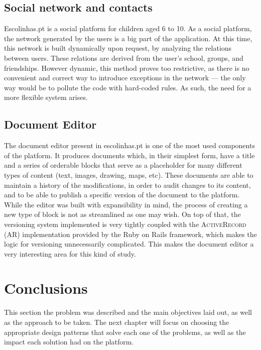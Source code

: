 \subsection{Social network and contacts}\label{sec:case-study_areas_social_network}
Escolinhas.pt is a social platform for children aged 6 to 10. As a social platform, the network generated by the users is a big part of the application. At this time, this network is built dynamically upon request, by analyzing the relations between users. These relations are derived from the user's school, groups, and friendships. However dynamic, this method proves too restrictive, as there is no convenient and correct way to introduce exceptions in the network --- the only way would be to pollute the code with hard-coded rules. As such, the need for a more flexible system arises.

\subsection{Document Editor}\label{sec:case-study_areas_document_editor}
The document editor present in escolinhas.pt is one of the most used components of the platform. It produces documents which, in their simplest form, have a title and a series of orderable blocks that serve as a placeholder for many different types of content (text, images, drawing, maps, etc). These documents are able to maintain a history of the modifications, in order to audit changes to its content, and to be able to publish a specific version of the document to the platform. While the editor was built with expansibility in mind, the process of creating a new type of block is not as streamlined as one may wish. On top of that, the versioning system implemented is very tightly coupled with the \textsc{ActiveRecord} (AR) implementation provided by the Ruby on Rails framework, which makes the logic for versioning unnecessarily complicated. This makes the document editor a very interesting area for this kind of study.

\section{Conclusions}\label{sec:problem_statement_conclusions}

This section the problem was described and the main objectives laid out, as well as the approach to be taken. The next chapter will focus on choosing the appropriate design patterns that solve each one of the problems, as well as the impact each solution had on the platform.


